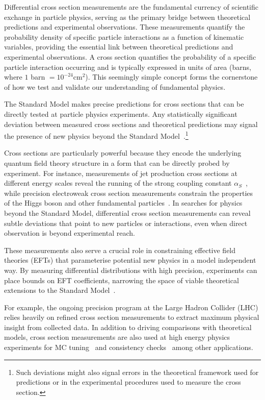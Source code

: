 \begin{definition}
Differential cross section measurements are the fundamental currency of scientific exchange in particle physics, serving as the primary bridge between theoretical predictions and experimental observations.
%
These measurements quantify the probability density of specific particle interactions as a function of kinematic variables, providing the essential link between theoretical predictions and experimental observations.
%
 A cross section quantifies the probability of a specific particle interaction occurring and is typically expressed in units of area (barns, where $1$ barn $= 10^{-24} \mathrm{cm}^2$). This seemingly simple concept forms the cornerstone of how we test and validate our understanding of fundamental physics.
 
The Standard Model makes precise predictions for cross sections that can be directly tested at particle physics experiments.
%
Any statistically significant deviation between measured cross sections and theoretical predictions may signal the presence of new physics beyond the Standard Model~\cite{particle_data_group_review_2022}.\footnote{Such deviations might also signal errors in the theoretical framework used for predictions or in the experimental procedures used to measure the cross section.
} 

Cross sections are particularly powerful because they encode the underlying quantum field theory structure in a form that can be directly probed by experiment.
%
For instance, measurements of jet production cross sections at different energy scales reveal the running of the strong coupling constant \(\alpha_S\)~\cite{chiefa_parton_2025}, while precision electroweak cross section measurements constrain the properties of the Higgs boson and other fundamental particles~\cite{noauthor_precision_2006}.
%
In searches for physics beyond the Standard Model, differential cross section measurements can reveal subtle deviations that point to new particles or interactions, even when direct observation is beyond experimental reach.

These measurements also serve a crucial role in constraining effective field theories (EFTs) that parameterise potential new physics in a model independent way.
%
By measuring differential distributions with high precision, experiments can place bounds on EFT coefficients, narrowing the space of viable theoretical extensions to the Standard Model~\cite{contino_validity_2016}.

For example, the ongoing precision program at the Large Hadron Collider (LHC) relies heavily on refined cross section measurements to extract maximum physical insight from collected data.
%
In addition to driving comparisons with theoretical models, cross section measurements are also used at high energy physics experiments for MC tuning~\cite{albert_antares_2025} and consistency checks~\cite{buckley_constraints_2025} among other applications.


\end{definition}
